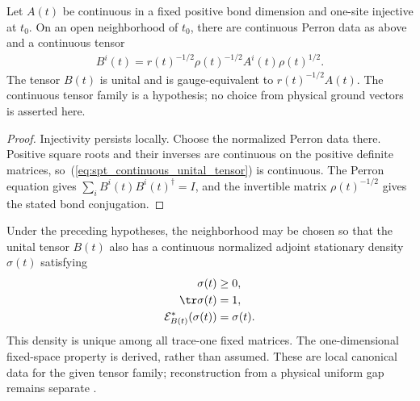 \begin{lemma}
    \label{thm:spt_continuous_unital_normalization}
    \leanok
    Let $A(t)$ be continuous in a fixed positive bond dimension and
    one-site injective at $t_0$. On an open neighborhood of $t_0$,
    there are continuous Perron data as above and a continuous tensor
    \begin{align}
        \label{eq:spt_continuous_unital_tensor}
        B^i(t)=r(t)^{-1/2}\rho(t)^{-1/2}A^i(t)\rho(t)^{1/2}.
    \end{align}
    The tensor $B(t)$ is unital and is gauge-equivalent to
    $r(t)^{-1/2}A(t)$. The continuous tensor family is a hypothesis;
    no choice from physical ground vectors is asserted here.
\end{lemma}

\begin{proof}\leanok
    Injectivity persists locally. Choose the normalized Perron data
    there. Positive square roots and their inverses are continuous on
    the positive definite matrices, so~(\ref{eq:spt_continuous_unital_tensor})
    is continuous. The Perron equation gives
    $\sum_iB^i(t)B^i(t)^\dagger=I$, and the invertible matrix
    $\rho(t)^{-1/2}$ gives the stated bond conjugation.
\end{proof}

\begin{lemma}
    \label{thm:spt_continuous_canonical_normalization}
    \leanok
    Under the preceding hypotheses, the neighborhood may be chosen
    so that the unital tensor $B(t)$ also has a continuous normalized
    adjoint stationary density $\sigma(t)$ satisfying
    \begin{align}
        \sigma(t)                      & \ge0, \notag       \\
        \tr\sigma(t)                   & =1, \notag         \\
        \mathcal E_{B(t)}^*(\sigma(t)) & =\sigma(t). \notag
    \end{align}
    This density is unique among all trace-one fixed matrices.
    The one-dimensional fixed-space property is derived, rather than
    assumed. These are local canonical data for the given tensor
    family; reconstruction from a physical uniform gap remains separate
    \cite{gap:spc11_spt_interpolation_upper_range}.
\end{lemma}

